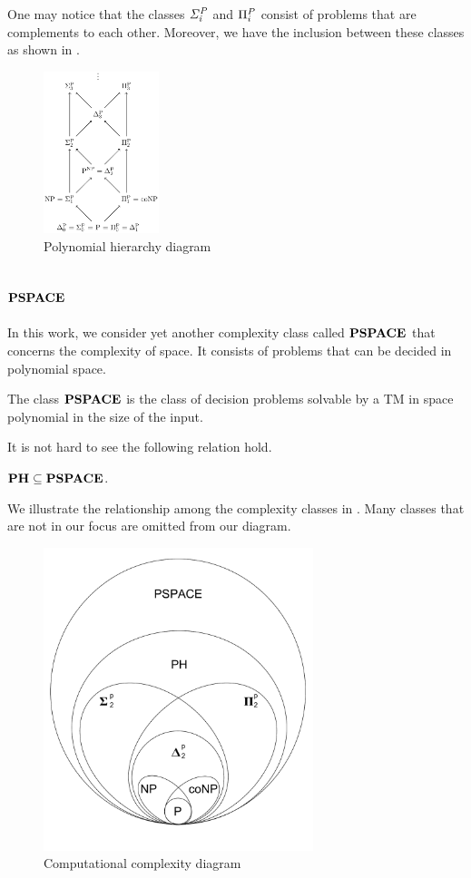 One may notice that the classes $\mathit{\Sigma^P_{i}}$ and $\Pi^P_{i}$ consist
of problems that are complements to each other.
Moreover, we have the inclusion between these classes as shown in .

\begin{figure}[h!]
  \centering
  \includegraphics[width=0.3\textwidth]{img/ph_diagram.png}
  \caption{Polynomial hierarchy diagram \label{fig:ph_diagram}}
\end{figure}

\subsection{$\textbf{PSPACE}$}
In this work, we consider yet another complexity class called $\textbf{PSPACE}$ that
concerns the complexity of space.
It consists of problems that can be decided in polynomial space.

\begin{definition}
	The class $\textbf{PSPACE}$ is the class of decision problems solvable by a TM
	in space polynomial in the size of the input.
\end{definition}
It is not hard to see the following relation hold.
\begin{center}
	$\textbf{PH} \subseteq \textbf{PSPACE}$.
\end{center}

We illustrate the relationship among the complexity classes in
. Many classes that are not in our focus 
are omitted from our diagram.

\begin{figure}[h!]
  \centering
  \includegraphics[width=0.7\textwidth]{img/comp_diagram.pdf}
  \caption{Computational complexity diagram \label{fig:comp_diagram}}
\end{figure}


